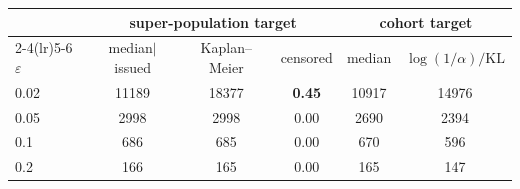 \begin{tabular}{lccccc}
\toprule
& \multicolumn{3}{c}{super-population target} & \multicolumn{2}{c}{cohort target}\\
\cmidrule(lr){2-4}\cmidrule(lr){5-6}
$\varepsilon$ & median$\mid$issued & Kaplan--Meier & censored & median & $\log(1/\alpha)/\mathrm{KL}$\\
\midrule
0.02 & 11189 & 18377 & \textbf{0.45} & 10917 & 14976\\
0.05 & 2998 & 2998 & 0.00 & 2690 & 2394\\
0.1 & 686 & 685 & 0.00 & 670 & 596\\
0.2 & 166 & 165 & 0.00 & 165 & 147\\
\bottomrule
\end{tabular}
